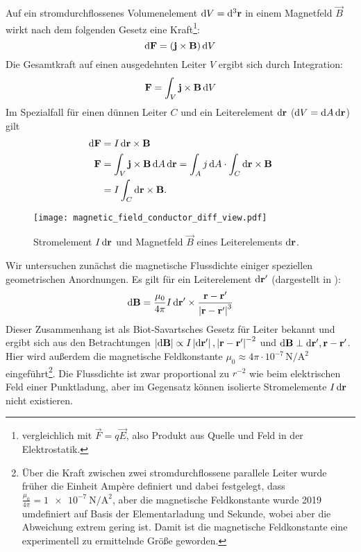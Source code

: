 Auf ein stromdurchflossenes Volumenelement $\mathop{}\!\mathrm{d} V=\mathop{}\!\mathrm{d}^3 \mathbf{r}$ in einem Magnetfeld $\vec B$ wirkt nach dem folgenden Gesetz eine Kraft\footnote{vergleichlich mit $\vec {F}=q\vec {E}$, also Produkt aus Quelle und Feld in der Elektrostatik. }:
\begin{equation*}
	\mathop{}\!\mathrm{d} \mathbf{F}=(\mathbf{j}\times\mathbf{B})\mathop{}\!\mathrm{d} V
\end{equation*}
Die Gesamtkraft auf einen ausgedehnten Leiter $V$ ergibt sich durch Integration:
\begin{equation*}
	\mathbf{F}=\int _{V}\mathbf{j}\times \mathbf{B}\mathop{}\!\mathrm{d} V
\end{equation*}
Im Spezialfall für einen dünnen Leiter $C$ und ein Leiterelement $\mathop{}\!\mathrm{d}\mathbf{r}$ ($\mathop{}\!\mathrm{d} V = \mathop{}\!\mathrm{d} A\mathop{}\!\mathrm{d}\mathbf{r}$) gilt
\begin{align}
	\label{eq:def_magn_flussdichte}
	\mathop{}\!\mathrm{d} \mathbf{F} & =I\mathop{}\!\mathrm{d}\mathbf{r}\times\mathbf{B}                                                                                               \\
	\mathbf{F}     & =\int _{V}\mathbf{j}\times \mathbf{B}\mathop{}\!\mathrm{d} A \mathop{}\!\mathrm{d}\mathbf{r} = \int_{A}j\mathop{}\!\mathrm{d} A \cdot \int_C \mathop{}\!\mathrm{d}\mathbf{r}\times \mathbf{B} \nonumber \\& = I\int_C \mathop{}\!\mathrm{d}\mathbf{r}\times \mathbf{B} .\nonumber
\end{align}

\begin{figure}[htb]
	\centering
	\texttt{[image: magnetic\_field\_conductor\_diff\_view.pdf]}
	\caption{Stromelement $I\mathop{}\!\mathrm{d}\mathbf{r}$ und Magnetfeld $\vec B$ eines Leiterelements $\mathop{}\!\mathrm{d} \mathbf{r}$. }
	\label{fig:magnetic_field_conductor_diff_view}
\end{figure}
Wir untersuchen zunächst die magnetische Flussdichte einiger speziellen geometrischen Anordnungen. Es gilt für ein Leiterelement $\mathop{}\!\mathrm{d} \mathbf{r}'$ (dargestellt in ):
\begin{equation*}
	\mathop{}\!\mathrm{d} \mathbf{B}=\frac{\mu _{0}}{4\pi }I\mathop{}\!\mathrm{d} \mathbf{r}'\times \frac{\mathbf{r}-\mathbf{r}'}{\left| \mathbf{r}-\mathbf{r}'\right| ^{3}}
\end{equation*}
Dieser Zusammenhang ist als Biot-Savartsches Gesetz für Leiter bekannt und ergibt sich aus den Betrachtungen $\left| \mathop{}\!\mathrm{d} \mathbf{B}\right| \propto I\left| \mathop{}\!\mathrm{d} \mathbf{r}'\right| , \left| \mathbf{r}-\mathbf{r}'\right| ^{-2}$ und $\mathop{}\!\mathrm{d} \mathbf{B}\perp \mathop{}\!\mathrm{d} \mathbf{r}',\mathbf{r}-\mathbf{r}'$. Hier wird außerdem die magnetische Feldkonstante $\mu _{0}\approx 4\pi \cdot 10^{-7}\,\si{\newton\per\square\ampere}$ eingeführt\footnote{Über die Kraft zwischen zwei stromdurchflossene parallele Leiter wurde früher die Einheit Ampère definiert und dabei festgelegt, dass $\frac{\mu _{0}}{4\pi }=\SI{1e-7}{\newton\per\square\ampere}$, aber die magnetische Feldkonstante wurde 2019 umdefiniert auf Basis der Elementarladung und Sekunde, wobei aber die Abweichung extrem gering ist. Damit ist die magnetische Feldkonstante eine experimentell zu ermittelnde Größe geworden. }. Die Flussdichte ist zwar proportional zu $r^{-2}$ wie beim elektrischen Feld einer Punktladung, aber im Gegensatz können isolierte Stromelemente $I\mathop{}\!\mathrm{d} \mathbf{r}$ nicht existieren.

